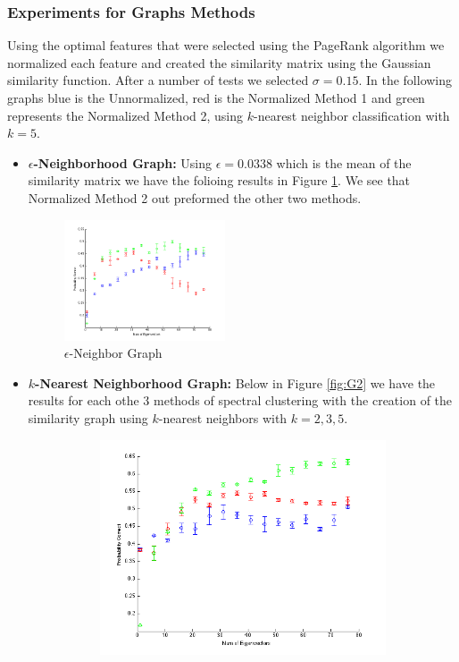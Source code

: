 \documentclass[12pt]{article}
\begin{document}
\subsubsection{Experiments for Graphs Methods} 
Using the optimal features that were selected using the PageRank algorithm we normalized each feature and created the similarity matrix using the Gaussian similarity function. After a number of tests we selected $\sigma = 0.15$. In the following graphs blue is the Unnormalized, red is the Normalized Method 1 and green represents the Normalized Method 2, using $k$-nearest neighbor classification with $k =5$. 
\begin{itemize}
\item{\bf{$\epsilon$-Neighborhood Graph:}} Using $\epsilon = 0.0338$ which is the mean of the similarity matrix we have the folioing results in Figure \ref{fig:G1}. We see that Normalized Method 2 out preformed the other two methods. 
\begin{figure}[h!]
   \centering
   \includegraphics[width=0.45\textwidth]{figures/G1_epsmean.png}
   \caption{$\epsilon$-Neighbor Graph}
   \label{fig:G1}
\end{figure}
\vspace{55mm}
\item{\bf{$k$-Nearest Neighborhood Graph:}} Below in Figure \ref{fig:G2} we have the results for each othe 3 methods of spectral clustering with the creation of the similarity graph using $k$-nearest neighbors with $k =2,3,5$. 
\begin{figure}[h!]
    \centering
        \begin{subfigure}[b]{0.45\textwidth}
                \includegraphics[width=\textwidth]{figures/G2_k_2.png}

\end{subfigure}
\end{figure}
\end{itemize}
\end{document}
